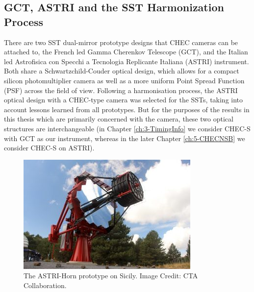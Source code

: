 \subsection{GCT, ASTRI and the SST Harmonization Process}

There are two SST dual-mirror prototype designs that CHEC cameras can be attached to, the French led Gamma Cherenkov Telescope (GCT), and the Italian led Astrofisica con Specchi a Tecnologia Replicante Italiana (ASTRI) instrument. Both share a Schwartzchild-Couder optical design, which allows for a compact silicon photomultiplier camera as well as a more uniform Point Spread Function (PSF) across the field of view. Following a harmonisation process, the ASTRI optical design with a CHEC-type camera was selected for the SSTs, taking into account lessons learned from all prototypes. But for the purposes of the results in this thesis which are primarily concerned with the camera, these two optical structures are interchangeable (in Chapter \ref{ch:3-TimingInfo} we consider CHEC-S with GCT as our instrument, whereas in the later  Chapter \ref{ch:5-CHECNSB} we consider CHEC-S on ASTRI). 

\begin{figure}[ht] 
        \centering \includegraphics[width=\columnwidth]{figures/astri-horn.jpg}
        \caption{
                \label{fig:astri} %
                The ASTRI-Horn prototype on Sicily. Image Credit: CTA Collaboration.
        }
\end{figure}

